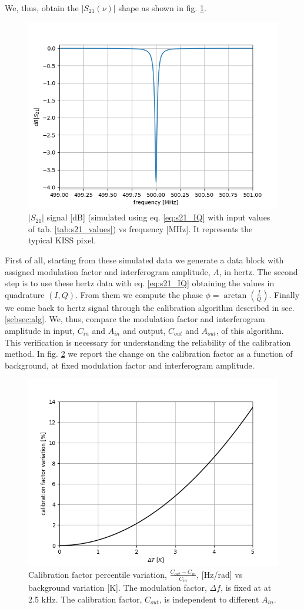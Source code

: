 \noindent We, thus, obtain the $\left|S_{21}(\nu)\right|$ shape as shown in fig. \ref{fig:s21_simu}.

\begin{figure}[htf]
	\centering
	\includegraphics[width=.5\textwidth]{3.acqui/resonance.png}
	\caption{$\left|S_{21} \right|$ signal [dB] (simulated using eq. \ref{eq:s21_IQ} with input values of tab. \ref{tab:s21_values}) vs frequency [MHz]. It represents the typical KISS pixel. }
	\label{fig:s21_simu}
\end{figure}

First of all, starting from these simulated data we generate a data block with assigned modulation factor and interferogram amplitude, $A$, in hertz. The second step is to use these hertz data with eq. \ref{eq:s21_IQ} obtaining the values in quadrature $(I,Q)$. From them we compute the phase $\phi=\arctan\left(\frac{I}{Q}\right)$. Finally we come back to hertz signal through the calibration algorithm described in sec. \ref{sebsec:alg}. We, thus, compare the modulation factor and interferogram amplitude in input, $C_{in}$ and $A_{in}$ and output, $C_{out}$ and $A_{out}$, of this algorithm. This verification is necessary for understanding the reliability of the calibration method. In fig. \ref{fig:cal_bck} we report the change on the calibration factor as a function of background, at fixed modulation factor and interferogram amplitude.

\begin{figure}[htf]
	\centering
	\includegraphics[width=.5\textwidth]{3.acqui/calibration_factor_variation.png}
	\caption{Calibration factor percentile variation, $\frac{C_{out}-C_{in}}{C_{in}}$, [Hz/rad] vs background variation [K]. The modulation factor, $\Delta f$, is fixed at at 2.5 kHz. The calibration factor, $C_{out}$, is independent to different $A_{in}$.}
	\label{fig:cal_bck}
\end{figure}

